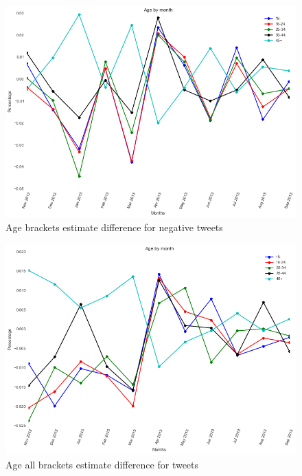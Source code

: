 \documentclass{sig-alternate}
\begin{document}
\begin{figure}[t]
\includegraphics[width=\columnwidth]{neg_45+diff.png}
\centering
\caption{ Age brackets estimate difference for negative tweets}
\label{figura:neg_45+diff}
\end{figure}

\begin{figure}[t]
\includegraphics[width=\columnwidth]{all_45+diff.png}
\centering
\caption{ Age all brackets estimate difference for tweets}
\label{figura:all_45+diff}
\end{figure}
\end{document}

